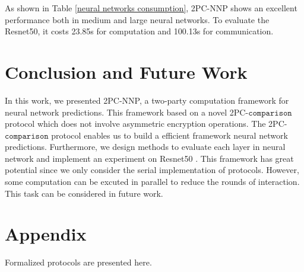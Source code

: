 \documentclass[letterpaper]{article} %
\begin{document}
    \begin{table}[!ht]

        \center
        \caption{Experiment III-Neural networks consumption}
        \label{neural networks consumption}
    \end{table}

    As shown in Table \ref{neural networks consumption}, 2PC-NNP shows an excellent performance
    both in medium and large neural networks. To evaluate the Resnet50,
    it costs 23.85s for computation and 100.13s for communication.

    \section{Conclusion and Future Work}
    In this work, we presented 2PC-NNP, a two-party computation framework for neural network predictions.
    This framework based on a novel 2PC-$\mathtt{comparison}$ protocol which does not involve asymmetric encryption operations.
    The 2PC-$\mathtt{comparison}$ protocol enables us to build a efficient framework neural network predictions.
    Furthermore, we design methods to evaluate each layer in neural network and implement an experiment on Resnet50 \cite{DeepResidualLearning}.
    This framework has great potential since we only consider the serial implementation of protocols.
    However, some computation can be excuted in parallel to reduce the rounds of interaction.
    This task can be considered in future work.
    \section{Appendix}
    Formalized protocols are presented here.
\end{document}

